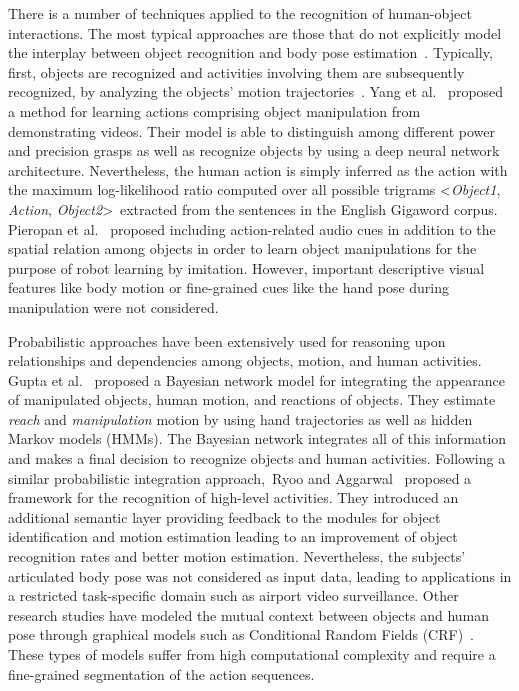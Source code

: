 \documentclass[5p,times]{elsarticle}
\begin{document}
There is a number of techniques applied to the recognition of human-object interactions.
The most typical approaches are those that do not explicitly model the interplay between object recognition and body pose estimation~\cite{cippitelli2016human, yang2014effective, sung2012unstructured}.
Typically, first, objects are recognized and activities involving them are subsequently recognized, by analyzing the objects' motion trajectories~\citep{wu2007scalable}.
Yang et al.~\citep{yang2015robot} proposed a method for learning actions comprising object manipulation from demonstrating videos.
Their model is able to distinguish among different power and precision grasps as well as recognize objects by using a deep neural network architecture.
Nevertheless, the human action is simply inferred as the action with the maximum log-likelihood ratio computed over all possible trigrams \textless\textit{Object1}, \textit{Action}, \textit{Object2}\textgreater ~extracted from the sentences in the English Gigaword corpus.
Pieropan et al.~\cite{pieropan2014audio} proposed including action-related audio cues in addition to the spatial relation among objects in order to learn object manipulations for the purpose of robot learning by imitation. 
However, important descriptive visual features like body motion or fine-grained cues like the hand pose during manipulation were not considered.

Probabilistic approaches have been extensively used for reasoning upon relationships and dependencies among objects, motion, and human activities.
Gupta et al.~\cite{gupta2007objects, gupta2009} proposed a Bayesian network model for integrating the appearance of manipulated objects, human motion, and reactions of objects.
They estimate \textit{reach} and \textit{manipulation} motion by using hand trajectories as well as hidden Markov models (HMMs).
The Bayesian network integrates all of this information and makes a final decision to recognize objects and human activities.
Following a similar probabilistic integration approach,~Ryoo and Aggarwal~\cite{ryoo2007hierarchical} proposed a framework for the recognition of high-level activities.
They introduced an additional semantic layer providing feedback to the modules for object identification and motion estimation leading to an improvement of object recognition rates and better motion estimation.
Nevertheless, the subjects' articulated body pose was not considered as input data, leading to applications in a restricted task-specific domain such as airport video surveillance.
Other research studies have modeled the mutual context between objects and human pose through graphical models such as Conditional Random Fields (CRF)~\cite{yao2012recognizing, koppula2013learning, kjellstrom2011visual}. These types of models suffer from high computational complexity and require a fine-grained segmentation of the action sequences. 
\end{document}
